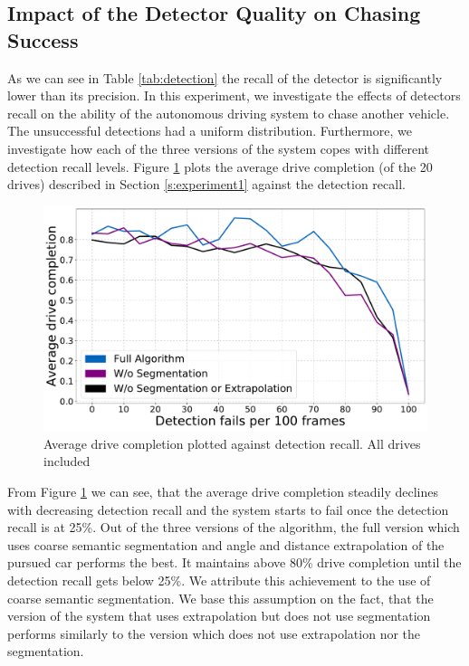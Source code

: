 \documentclass{ctuthesis/ctuthesis}
\begin{document}
\subsection{Impact of the Detector Quality on Chasing Success}
As we can see in Table \ref{tab:detection} the recall of the detector is significantly lower than its precision. In this experiment, we investigate the effects of detectors recall on the ability of the autonomous driving system to chase another vehicle. The unsuccessful detections had a uniform distribution. Furthermore, we investigate how each of the three versions of the system copes with different detection recall levels. Figure \ref{f:detection_recall} plots the average drive completion (of the 20 drives) described in Section \ref{s:experiment1} against the detection recall. \par


\begin{figure}[]
    \centering
    \includegraphics[width=1\textwidth]{images/recall_chart7.pdf}
    
    \caption{Average drive completion plotted against detection recall. All drives included}\label{f:detection_recall}
\end{figure}

From Figure \ref{f:detection_recall} we can see, that the average drive completion steadily declines with decreasing detection recall and the system starts to fail once the detection recall is at 25\%. Out of the three versions of the algorithm, the full version which uses coarse semantic segmentation and angle and distance extrapolation of the pursued car performs the best. It maintains above 80\% drive completion until the detection recall gets below 25\%. We attribute this achievement to the use of coarse semantic segmentation. We base this assumption on the fact, that the version of the system that uses extrapolation but does not use segmentation performs similarly to the version which does not use extrapolation nor the segmentation. \par
\end{document}
